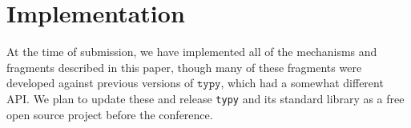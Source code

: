 \documentclass[preprint,10pt]{sigplanconf}
\newcommand{\typy}{\texttt{typy}}
\newcommand{\lip}[1]{\lstinline[language=Python,basicstyle=\ttfamily\footnotesize,deletendkeywords={tuple,buffer,map}]{#1}}
\begin{document}

\section*{Implementation}
At the time of submission, we have implemented all of the mechanisms and fragments described in this paper, though many of these fragments were developed against previous versions of $\typy$, which had a somewhat different API. We plan to update these and release \verb|typy| and its standard library as a free open source project before the conference. %







\end{document}
